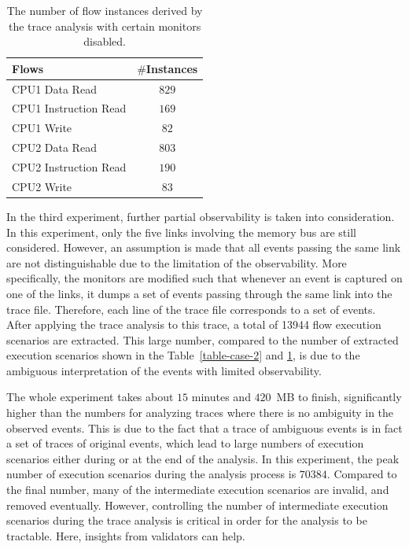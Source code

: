 \documentclass[conference]{IEEEtran}
\begin{document}
\begin{table}[tb]
\caption{The number of flow instances derived by the trace analysis with certain monitors disabled.}
\begin{center}
\begin{tabular}{|l|c|}
\hline
Flows & $\#$Instances \\
\hline
\hline
CPU1 Data Read			&  $829$\\
CPU1 Instruction Read		&  $169$\\
CPU1 Write				&  $82$\\
\hline
CPU2 Data Read			&  $803$\\
CPU2 Instruction Read		&  $190$\\
CPU2 Write				&  $83$\\
\hline
\end{tabular}
\end{center}
\label{table-par-obs}
\end{table}%

In the third experiment, further partial observability is taken into consideration.  In this experiment, only the five links involving the memory bus are still considered.  However, an assumption is made that all events passing the same link are not distinguishable due to the limitation of the observability.  More specifically, the monitors are modified such that whenever an event is captured on one of the links, it dumps a set of events passing through the same link into the trace file.  Therefore, each line of the trace file corresponds to a set of events.  After applying the trace analysis to this trace,  a total of 13944 flow execution scenarios are extracted.    This large number, compared to the number of extracted execution scenarios shown in the Table~\ref{table-case-2} and \ref{table-par-obs}, is due to the ambiguous interpretation of the events with limited observability.  

The whole experiment takes about $15$ minutes and $420$~MB to finish, significantly higher than the numbers for analyzing traces where there is no ambiguity in the observed events.  This is due to the fact that a trace of ambiguous events is in fact a set of traces of original events, which lead to large numbers of execution scenarios either during or at the end of the analysis.  In this experiment, the peak number of execution scenarios during the analysis process is $70384$.   Compared to the final number, many of the intermediate execution scenarios are invalid, and removed eventually.  However, controlling the number of intermediate execution scenarios during the trace analysis is critical in order for the analysis to be tractable.  Here, insights from validators can help.    
\end{document}
